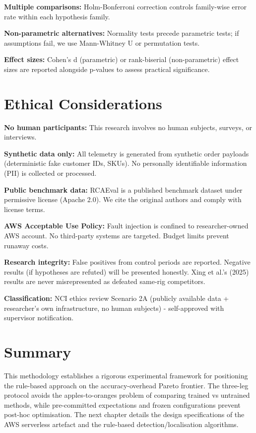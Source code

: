 \textbf{Multiple comparisons:} Holm-Bonferroni correction controls family-wise error rate within each hypothesis family.

\textbf{Non-parametric alternatives:} Normality tests precede parametric tests; if assumptions fail, we use Mann-Whitney U or permutation tests.

\textbf{Effect sizes:} Cohen's d (parametric) or rank-biserial (non-parametric) effect sizes are reported alongside p-values to assess practical significance.

\section{Ethical Considerations}

\textbf{No human participants:} This research involves no human subjects, surveys, or interviews.

\textbf{Synthetic data only:} All telemetry is generated from synthetic order payloads (deterministic fake customer IDs, SKUs). No personally identifiable information (PII) is collected or processed.

\textbf{Public benchmark data:} RCAEval is a published benchmark dataset under permissive license (Apache 2.0). We cite the original authors and comply with license terms.

\textbf{AWS Acceptable Use Policy:} Fault injection is confined to researcher-owned AWS account. No third-party systems are targeted. Budget limits prevent runaway costs.

\textbf{Research integrity:} False positives from control periods are reported. Negative results (if hypotheses are refuted) will be presented honestly. Xing et al.'s (2025) results are never misrepresented as defeated same-rig competitors.

\textbf{Classification:} NCI ethics review Scenario 2A (publicly available data + researcher's own infrastructure, no human subjects) - self-approved with supervisor notification.

\section{Summary}

This methodology establishes a rigorous experimental framework for positioning the rule-based approach on the accuracy-overhead Pareto frontier. The three-leg protocol avoids the apples-to-oranges problem of comparing trained vs untrained methods, while pre-committed expectations and frozen configurations prevent post-hoc optimisation. The next chapter details the design specifications of the AWS serverless artefact and the rule-based detection/localisation algorithms.
